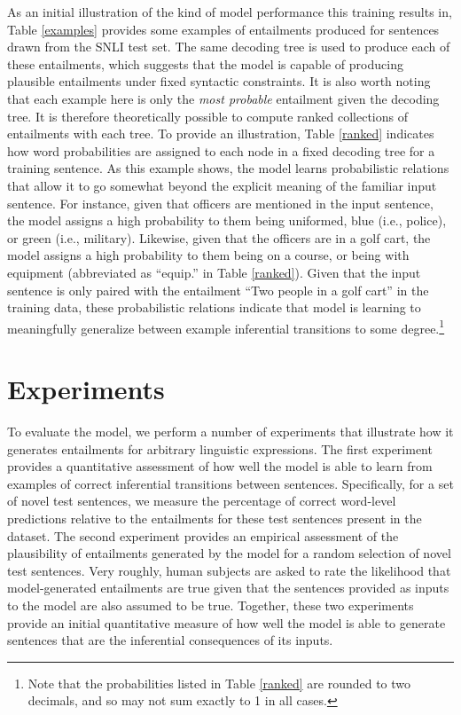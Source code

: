 \documentclass[utf8]{frontiersSCNS} %
\begin{document}
As an initial illustration of the kind of model performance this training results in, Table \ref{examples} provides some examples of entailments produced for sentences drawn from the SNLI test set. The same decoding tree is used to produce each of these entailments, which suggests that the model is capable of producing plausible entailments under fixed syntactic constraints. It is also worth noting that each example here is only the \textit{most probable} entailment given the decoding tree. It is therefore theoretically possible to compute ranked collections of entailments with each tree. To provide an illustration, Table \ref{ranked} indicates how word probabilities are assigned to each node in a fixed decoding tree for a training sentence. As this example shows, the model learns probabilistic relations that allow it to go somewhat beyond the explicit meaning of the familiar input sentence. For instance, given that officers are mentioned in the input sentence, the model assigns a high probability to them being uniformed, blue (i.e., police), or green (i.e., military). Likewise, given that the officers are in a golf cart, the model assigns a high probability to them being on a course, or being with equipment (abbreviated as ``equip.'' in Table \ref{ranked}). Given that the input sentence is only paired with the entailment ``Two people in a golf cart'' in the training data, these probabilistic relations indicate that model is learning to meaningfully generalize between example inferential transitions to some degree.\footnote{Note that the probabilities listed in Table \ref{ranked} are rounded to two decimals, and so may not sum exactly to 1 in all cases.} 

\section{Experiments}

To evaluate the model, we perform a number of experiments that illustrate how it generates entailments for arbitrary linguistic expressions. The first experiment provides a quantitative assessment of how well the model is able to learn from examples of correct inferential transitions between sentences. Specifically, for a set of novel test sentences, we measure the percentage of correct word-level predictions relative to the entailments for these test sentences present in the dataset. The second experiment provides an empirical assessment of the plausibility of entailments generated by the model for a random selection of novel test sentences. Very roughly, human subjects are asked to rate the likelihood that model-generated entailments are true given that the sentences provided as inputs to the model are also assumed to be true. Together, these two experiments provide an initial quantitative measure of how well the model is able to generate sentences that are the inferential consequences of its inputs.
\end{document}
